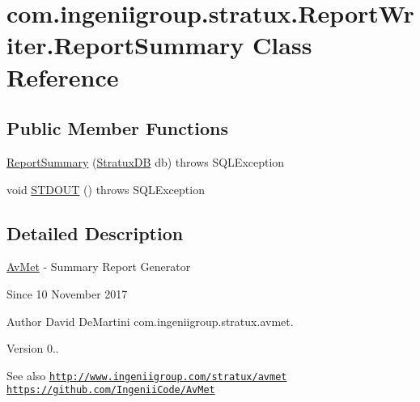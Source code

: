 \hypertarget{classcom_1_1ingeniigroup_1_1stratux_1_1_report_writer_1_1_report_summary}{}\section{com.\+ingeniigroup.\+stratux.\+Report\+Writer.\+Report\+Summary Class Reference}
\label{classcom_1_1ingeniigroup_1_1stratux_1_1_report_writer_1_1_report_summary}
\subsection*{Public Member Functions}
\begin{DoxyCompactItemize}
\item 
\hyperlink{classcom_1_1ingeniigroup_1_1stratux_1_1_report_writer_1_1_report_summary_a8e906617106cf4cd896881bcce1ec5da}{Report\+Summary} (\hyperlink{classcom_1_1ingeniigroup_1_1stratux_1_1db_connect_1_1_stratux_d_b}{Stratux\+DB} db)  throws S\+Q\+L\+Exception  
\item 
void \hyperlink{classcom_1_1ingeniigroup_1_1stratux_1_1_report_writer_1_1_report_summary_a76ec4a98415dc16c9c6a9c641a505821}{S\+T\+D\+O\+UT} ()  throws S\+Q\+L\+Exception 
\end{DoxyCompactItemize}


\subsection{Detailed Description}
\hyperlink{namespacecom_1_1ingeniigroup_1_1stratux_1_1_av_met}{Av\+Met} -\/ Summary Report Generator

\begin{DoxySince}{Since}
10 November 2017 
\end{DoxySince}
\begin{DoxyAuthor}{Author}
David De\+Martini  com.\+ingeniigroup.\+stratux.\+avmet. 
\end{DoxyAuthor}
\begin{DoxyVersion}{Version}
0.. 
\end{DoxyVersion}
\begin{DoxySeeAlso}{See also}
\href{http://www.ingeniigroup.com/stratux/avmet}{\tt http\+://www.\+ingeniigroup.\+com/stratux/avmet}  \href{https://github.com/IngeniiCode/AvMet}{\tt https\+://github.\+com/\+Ingenii\+Code/\+Av\+Met} 
\end{DoxySeeAlso}


